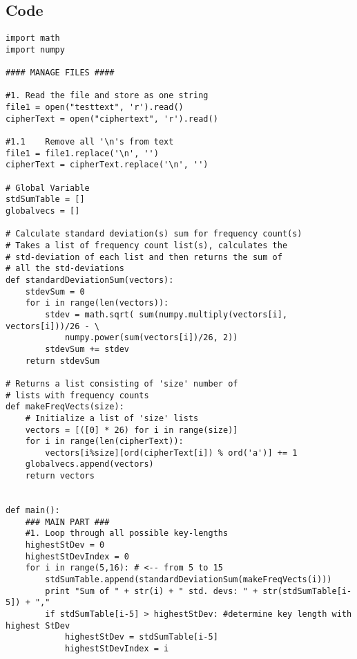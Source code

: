 \documentclass[a4paper]{article}
\begin{document}
\subsection{Code}

\begin{lstlisting} 
import math
import numpy

#### MANAGE FILES ####

#1. Read the file and store as one string
file1 = open("testtext", 'r').read() 
cipherText = open("ciphertext", 'r').read()

#1.1	Remove all '\n's from text
file1 = file1.replace('\n', '')
cipherText = cipherText.replace('\n', '')

# Global Variable
stdSumTable = []
globalvecs = []

# Calculate standard deviation(s) sum for frequency count(s)
# Takes a list of frequency count list(s), calculates the
# std-deviation of each list and then returns the sum of
# all the std-deviations
def standardDeviationSum(vectors):
	stdevSum = 0
	for i in range(len(vectors)):
		stdev = math.sqrt( sum(numpy.multiply(vectors[i], vectors[i]))/26 - \
			numpy.power(sum(vectors[i])/26, 2))
		stdevSum += stdev
	return stdevSum

# Returns a list consisting of 'size' number of
# lists with frequency counts
def makeFreqVects(size):
	# Initialize a list of 'size' lists
	vectors = [([0] * 26) for i in range(size)]
	for i in range(len(cipherText)):
		vectors[i%size][ord(cipherText[i]) % ord('a')] += 1
	globalvecs.append(vectors)
	return vectors


def main():
	### MAIN PART ###
	#1. Loop through all possible key-lengths
	highestStDev = 0
	highestStDevIndex = 0
	for i in range(5,16): # <-- from 5 to 15
		stdSumTable.append(standardDeviationSum(makeFreqVects(i)))
		print "Sum of " + str(i) + " std. devs: " + str(stdSumTable[i-5]) + ","
		if stdSumTable[i-5] > highestStDev: #determine key length with highest StDev
			highestStDev = stdSumTable[i-5]
			highestStDevIndex = i


\end{lstlisting}
\end{document}

